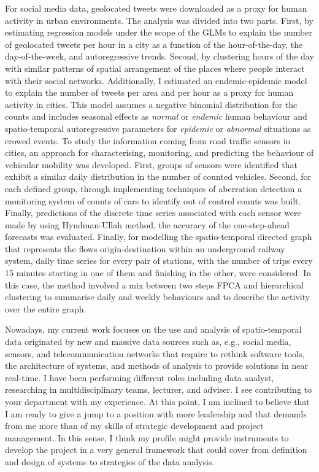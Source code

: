 \documentclass[11pt, a4paper]{awesome-cv}
\begin{document}
\begin{cvletter}
For social media data, geolocated tweets were downloaded as a proxy for human activity in urban environments. The analysis was divided into two parts. First, by estimating regression models under the scope of the GLMs to explain the number of geolocated tweets per hour in a city as a function of the hour-of-the-day, the day-of-the-week, and autoregressive trends. Second, by clustering hours of the day with similar patterns of spatial arrangement of the places where people interact with their social networks. Additionally, I estimated an endemic-epidemic model to explain the number of tweets per area and per hour as a proxy for human activity in cities. This model assumes a negative binomial distribution for the counts and includes seasonal effects as \emph{normal} or \emph{endemic} human behaviour and spatio-temporal autoregressive parameters for \emph{epidemic} or \emph{abnormal} situations as crowed events. To study the information coming from road traffic sensors in cities, an approach for characterising, monitoring, and predicting the behaviour of vehicular mobility was developed. First, groups of sensors were identified that exhibit a similar daily distribution in the number of counted vehicles. Second, for each defined group, through implementing techniques of aberration detection a monitoring system of counts of cars to identify out of control counts was built. Finally, predictions of the discrete time series associated with each sensor were made by using Hyndman-Ullah method, the accuracy of the one-step-ahead forecasts was evaluated. Finally, for modelling the spatio-temporal directed graph that represents the flows origin-destination within an underground railway system, daily time series for every pair of stations, with the number of trips every 15 minutes starting in one of them and finishing in the other, were considered. In this case, the method involved a mix between two steps FPCA and hierarchical clustering to summarise daily and weekly behaviours and to describe the activity over the entire graph.\par
Nowadays, my current work focuses on the use and analysis of spatio-temporal data originated by new and massive data sources such as, e.g., social media, sensors, and telecommunication networks that require to rethink software tools, the architecture of systems, and methods of analysis to provide solutions in near real-time. I have been performing different roles including data analyst, researching in multidisciplinary teams, lecturer, and adviser. I see contributing to your department with my experience. At this point, I am inclined to believe that I am ready to give a jump to a position with more leadership and that demands from me more than of my skills of strategic development and project management. In this sense, I think my profile might provide instruments to develop the project in a very general framework that could cover from definition and design of systems to strategies of the data analysis.\par

\end{cvletter}
\end{document}
